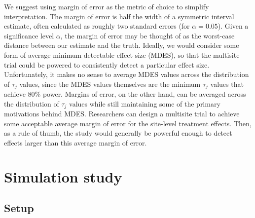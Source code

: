 \documentclass[]{article}
\begin{document}
We suggest using margin of error as the metric of choice to simplify interpretation.
The margin of error is half the width of a symmetric interval estimate, often calculated as roughly two standard errors (for $\alpha=0.05$).
Given a significance level $\alpha$, the margin of error may be thought of as the worst-case distance between our estimate and the truth.
Ideally, we would consider some form of average minimum detectable effect size (MDES), so that the multisite trial could be powered to consistently detect a particular effect size.
Unfortunately, it makes no sense to average MDES values across the distribution of $\tau_j$ values, since the MDES values themselves are the minimum $\tau_j$ values that achieve 80\% power.
Margins of error, on the other hand, can be averaged across the distribution of $\tau_j$ values while still maintaining some of the primary motivations behind MDES.
Researchers can design a multisite trial to achieve some acceptable average margin of error for the site-level treatment effects.
Then, as a rule of thumb, the study would generally be powerful enough to detect effects larger than this average margin of error.




\section{Simulation study}

\subsection{Setup}
\end{document}
